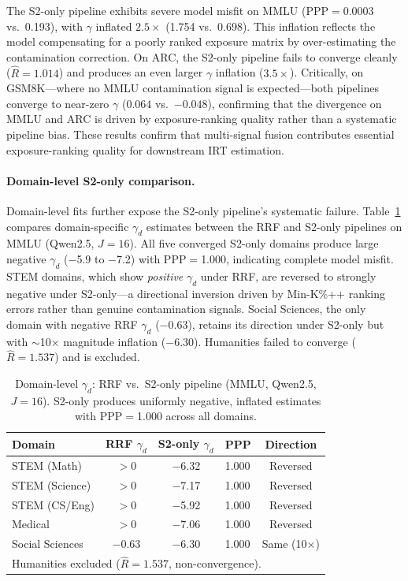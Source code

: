 The S2-only pipeline exhibits severe model misfit on MMLU (PPP$=$0.0003 vs.\ 0.193), with $\gamma$ inflated $2.5\times$ (1.754 vs.\ 0.698). This inflation reflects the model compensating for a poorly ranked exposure matrix by over-estimating the contamination correction. On ARC, the S2-only pipeline fails to converge cleanly ($\hat{R}=1.014$) and produces an even larger $\gamma$ inflation ($3.5\times$). Critically, on GSM8K---where no MMLU contamination signal is expected---both pipelines converge to near-zero $\gamma$ ($0.064$ vs.\ $-0.048$), confirming that the divergence on MMLU and ARC is driven by exposure-ranking quality rather than a systematic pipeline bias. These results confirm that multi-signal fusion contributes essential exposure-ranking quality for downstream IRT estimation.

\paragraph{Domain-level S2-only comparison.}
Domain-level fits further expose the S2-only pipeline's systematic failure. Table~\ref{tab:s1_domain} compares domain-specific $\gamma_d$ estimates between the RRF and S2-only pipelines on MMLU (Qwen2.5, $J\!=\!16$). All five converged S2-only domains produce large negative $\gamma_d$ ($-$5.9 to $-$7.2) with PPP$=$1.000, indicating complete model misfit. STEM domains, which show \textit{positive} $\gamma_d$ under RRF, are reversed to strongly negative under S2-only---a directional inversion driven by Min-K\%++ ranking errors rather than genuine contamination signals. Social Sciences, the only domain with negative RRF $\gamma_d$ ($-$0.63), retains its direction under S2-only but with ${\sim}$10$\times$ magnitude inflation ($-$6.30). Humanities failed to converge ($\hat{R}=1.537$) and is excluded.

\begin{table}[h]
\centering
\caption{Domain-level $\gamma_d$: RRF vs.\ S2-only pipeline (MMLU, Qwen2.5, $J\!=\!16$). S2-only produces uniformly negative, inflated estimates with PPP$=$1.000 across all domains.}
\label{tab:s1_domain}
\footnotesize
\begin{tabular}{lcclc}
\toprule
Domain & RRF $\gamma_d$ & S2-only $\gamma_d$ & PPP & Direction \\
\midrule
STEM (Math) & $>$0 & $-$6.32 & 1.000 & Reversed \\
STEM (Science) & $>$0 & $-$7.17 & 1.000 & Reversed \\
STEM (CS/Eng) & $>$0 & $-$5.92 & 1.000 & Reversed \\
Medical & $>$0 & $-$7.06 & 1.000 & Reversed \\
Social Sciences & $-$0.63 & $-$6.30 & 1.000 & Same (10$\times$) \\
\bottomrule
\multicolumn{5}{l}{\scriptsize Humanities excluded ($\hat{R}=1.537$, non-convergence).}
\end{tabular}
\end{table}

